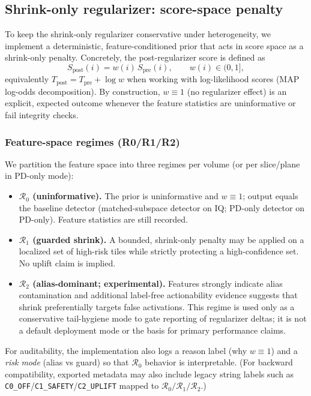 \subsection{Shrink-only regularizer: score-space penalty}
\label{app:ka-contract-v2-full}

To keep the shrink-only regularizer conservative under heterogeneity, we implement a deterministic, feature-conditioned prior that acts in score space as a shrink-only penalty. Concretely, the post-regularizer score is defined as
\[
S_{\mathrm{post}}(i)=w(i)\,S_{\mathrm{pre}}(i),\qquad w(i)\in(0,1],
\]
equivalently $T_{\mathrm{post}}=T_{\mathrm{pre}}+\log w$ when working with log-likelihood scores (MAP log-odds decomposition). By construction, $w\equiv 1$ (no regularizer effect) is an explicit, expected outcome whenever the feature statistics are uninformative or fail integrity checks.

\subsubsection{Feature-space regimes (R0/R1/R2)}
We partition the feature space into three regimes per volume (or per slice/plane in PD-only mode):
\begin{itemize}[nosep]
  \item \textbf{$\mathcal{R}_0$ (uninformative).} The prior is uninformative and $w\equiv 1$; output equals the baseline detector (matched-subspace detector on IQ; PD-only detector on PD-only). Feature statistics are still recorded.
  \item \textbf{$\mathcal{R}_1$ (guarded shrink).} A bounded, shrink-only penalty may be applied on a localized set of high-risk tiles while strictly protecting a high-confidence set. No uplift claim is implied.
  \item \textbf{$\mathcal{R}_2$ (alias-dominant; experimental).} Features strongly indicate alias contamination and additional label-free actionability evidence suggests that shrink preferentially targets false activations. This regime is used only as a conservative tail-hygiene mode to gate reporting of regularizer deltas; it is not a default deployment mode or the basis for primary performance claims.
\end{itemize}
For auditability, the implementation also logs a reason label (why $w\equiv 1$) and a \emph{risk mode} (alias vs guard) so that $\mathcal{R}_0$ behavior is interpretable. (For backward compatibility, exported metadata may also include legacy string labels such as \texttt{C0\_OFF}/\texttt{C1\_SAFETY}/\texttt{C2\_UPLIFT} mapped to $\mathcal{R}_0/\mathcal{R}_1/\mathcal{R}_2$.)

